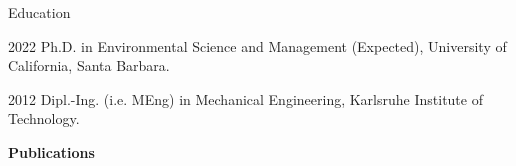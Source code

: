 \begin{vitae}

\begin{vitaesection}{Education}
\vspace{-0.1cm}
\item [2022]	Ph.D. in Environmental Science and Management (Expected), University of California, Santa Barbara.
\item [2012]	Dipl.-Ing.  (i.e. MEng) in Mechanical Engineering, Karlsruhe Institute of Technology.
\end{vitaesection}

\textbf{Publications}

        
        
        
    
    





\end{vitae}

